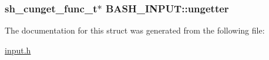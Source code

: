 \subsubsection[{\texorpdfstring{ungetter}{ungetter}}]{\setlength{\rightskip}{0pt plus 5cm}sh\+\_\+cunget\+\_\+func\+\_\+t$\ast$ B\+A\+S\+H\+\_\+\+I\+N\+P\+U\+T\+::ungetter}\hypertarget{structBASH__INPUT_aa5691d540e34f34766b758ded878d07c}{}\label{structBASH__INPUT_aa5691d540e34f34766b758ded878d07c}


The documentation for this struct was generated from the following file\+:\begin{DoxyCompactItemize}
\item 
\hyperlink{input_8h}{input.\+h}\end{DoxyCompactItemize}
